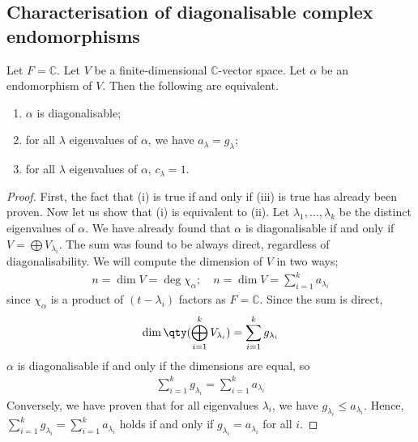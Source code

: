 \subsection{Characterisation of diagonalisable complex endomorphisms}
\begin{lemma}
	Let $F = \mathbb C$.
	Let $V$ be a finite-dimensional $\mathbb C$-vector space.
	Let $\alpha$ be an endomorphism of $V$.
	Then the following are equivalent.
	\begin{enumerate}
		\item $\alpha$ is diagonalisable;
		\item for all $\lambda$ eigenvalues of $\alpha$, we have $a_\lambda = g_\lambda$;
		\item for all $\lambda$ eigenvalues of $\alpha$, $c_\lambda = 1$.
	\end{enumerate}
\end{lemma}
\begin{proof}
	First, the fact that (i) is true if and only if (iii) is true has already been proven.
	Now let us show that (i) is equivalent to (ii).
	Let $\lambda_1, \dots, \lambda_k$ be the distinct eigenvalues of $\alpha$.
	We have already found that $\alpha$ is diagonalisable if and only if $V = \bigoplus V_{\lambda_i}$.
	The sum was found to be always direct, regardless of diagonalisability.
	We will compute the dimension of $V$ in two ways;
	\begin{align*}
		n = \dim V = \deg \chi_\alpha;\quad n = \dim V = \sum_{i=1}^k a_{\lambda_i}
	\end{align*}
	since $\chi_\alpha$ is a product of $(t-\lambda_i)$ factors as $F = \mathbb C$.
	Since the sum is direct,
	\begin{align*}
		\dim \qty(\bigoplus_{i=1}^k V_{\lambda_i}) = \sum_{i=1}^k g_{\lambda_i}
	\end{align*}
	$\alpha$ is diagonalisable if and only if the dimensions are equal, so
	\begin{align*}
		\sum_{i=1}^k g_{\lambda_i} = \sum_{i=1}^k a_{\lambda_i}
	\end{align*}
	Conversely, we have proven that for all eigenvalues $\lambda_i$, we have $g_{\lambda_i} \leq a_{\lambda_i}$.
	Hence, $\sum_{i=1}^k g_{\lambda_i} = \sum_{i=1}^k a_{\lambda_i}$ holds if and only if $g_{\lambda_i} = a_{\lambda_i}$ for all $i$.
\end{proof}